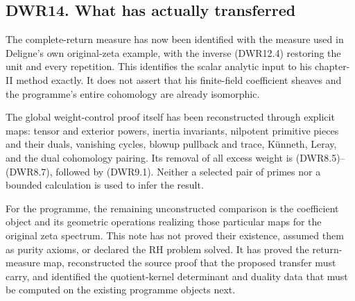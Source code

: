 \subsection{DWR14. What has actually
transferred}\label{dwr14.-what-has-actually-transferred}

The complete-return measure has now been identified with the measure
used in Deligne's own original-zeta example, with the inverse (DWR12.4)
restoring the unit and every repetition. This identifies the scalar
analytic input to his chapter-II method exactly. It does not assert that
his finite-field coefficient sheaves and the programme's entire
cohomology are already isomorphic.

The global weight-control proof itself has been reconstructed through
explicit maps: tensor and exterior powers, inertia invariants, nilpotent
primitive pieces and their duals, vanishing cycles, blowup pullback and
trace, Künneth, Leray, and the dual cohomology pairing. Its removal of
all excess weight is (DWR8.5)--(DWR8.7), followed by (DWR9.1). Neither a
selected pair of primes nor a bounded calculation is used to infer the
result.

For the programme, the remaining unconstructed comparison is the
coefficient object and its geometric operations realizing those
particular maps for the original zeta spectrum. This note has not proved
their existence, assumed them as purity axioms, or declared the RH
problem solved. It has proved the return-measure map, reconstructed the
source proof that the proposed transfer must carry, and identified the
quotient-kernel determinant and duality data that must be computed on
the existing programme objects next.
